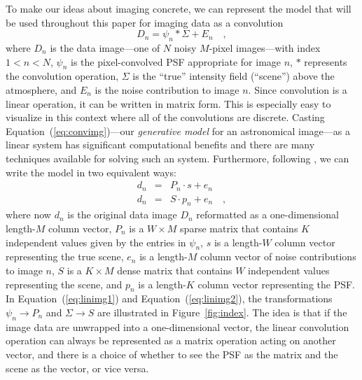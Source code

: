\documentclass[12pt,preprint]{aastex}
\newcommand{\Fig}[1]{Figure~\ref{fig:#1}}
\newcommand{\fig}[1]{\Fig{#1}}
\newcommand{\Eq}[1]{Equation~(\ref{eq:#1})}
\newcommand{\eq}[1]{\Eq{#1}}
\newcommand{\eqlabel}[1]{\label{eq:#1}}
\newcommand{\data}{\ensuremath{D}}
\newcommand{\scene}{\ensuremath{\Sigma}}
\newcommand{\psf}{\ensuremath{\psi}}
\newcommand{\dvec}{\ensuremath{d}}
\newcommand{\evec}{\ensuremath{e}}
\newcommand{\svec}{\ensuremath{s}}
\newcommand{\smat}{\ensuremath{S}}
\newcommand{\pvec}{\ensuremath{p}}
\newcommand{\pmat}{\ensuremath{P}}
\begin{document}

To make our ideas about imaging concrete, we can represent the model
that will be used throughout this paper for imaging data as a
convolution
\begin{equation}\eqlabel{convimg}
    \data_n = \psf_n \ast \scene + E_n \quad,
\end{equation}
where $\data_n$ is the data image---one of $N$ noisy $M$-pixel
images---with index $1<n<N$, $\psf_n$ is the pixel-convolved PSF
appropriate for image $n$, $\ast$ represents the convolution
operation, $\scene$ is the ``true'' intensity field (``scene'') above
the atmosphere, and $E_n$ is the noise contribution to image $n$.
Since convolution is a linear operation, it can be written in matrix
form. This is especially easy to visualize in this context where all of
the convolutions are discrete. Casting \eq{convimg}---our
\emph{generative model} for an astronomical image---as a linear system
has significant computational benefits and there are many techniques
available for solving such an system. Furthermore, following
\citet{hirsch}, we can write the model in two equivalent ways:
\begin{eqnarray}\displaystyle
\dvec_n &=& \pmat_n \cdot \svec + \evec_n \eqlabel{linimg1}
\\
\dvec_n &=& \smat \cdot \pvec_n + \evec_n \eqlabel{linimg2}
\quad ,
\end{eqnarray}
where now $\dvec_n$ is the original data image $\data_n$ reformatted as a
one-dimensional length-$M$ column vector, $\pmat_n$ is a $W\times M$
sparse matrix that contains $K$ independent values given by the entries
in $\psf_n$, $s$ is a length-$W$ column vector representing the true
scene, $\evec_n$ is a length-$M$ column vector of noise contributions to
image $n$, $\smat$ is a $K\times M$ dense matrix that contains $W$
independent values representing the scene, and $\pvec_n$ is a length-$K$
column vector representing the PSF\@. In \eq{linimg1} and \eq{linimg2},
the transformations
$\psf_n \to \pmat_n$ and $\scene \to \smat$ are illustrated in \fig{index}.
The idea is that if the image data are unwrapped into a
one-dimensional vector, the linear convolution operation can always be
represented as a matrix operation acting on another vector, and there
is a choice of whether to see the PSF as the matrix and the scene as
the vector, or vice versa.
\end{document}
